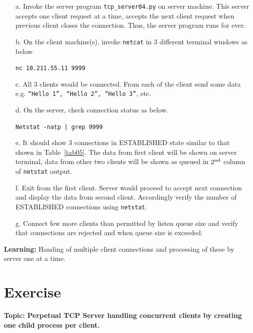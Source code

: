 \begin{multicols}{2}
\begin{itemize}
\item[a.] Invoke the server program \texttt{tcp\_server04.py} on server machine. This server accepts one client request at a time, accepts the next client request when previous client closes the connection. Thus, the server program runs for ever.

\item[b.] On the client machine(s), invoke \texttt{netcat} in 3 different terminal windows as below

\texttt{nc 10.211.55.11 9999}

\item[c.] All 3 clients would be connected. From each of the client send some data e.g. \texttt{“Hello 1”, “Hello 2”, “Hello 3”}, etc.

\item[d.] On the server, check connection status as below.

\texttt{Netstat -natp | grep 9999}

\item[e.] It should show 3 connections in ESTABLISHED state similar to that shown in Table~\ref{tab05}. The data from first client will be shown on server terminal, data from other two clients will be shown as queued in $2^{\rm nd}$ column of \texttt{netstat} output.

\item[f.] Exit from the first client. Server would proceed to accept next connection and display the data from second client. Accordingly verify the number of ESTABLISHED connections using \texttt{netstat}.

\item[g.] Connect few more clients than permitted by listen queue size and verify that connections are rejected and when queue size is exceeded.

\end{itemize}

\textbf{Learning:} Handing of multiple client connections and processing of these by server one at a time.

\section*{Exercise \label{chap1-exe03}}

\textbf{Topic: Perpetual TCP Server handling concurrent clients by creating one child process per client.}

\begin{itemize}


\end{itemize}
\end{multicols}
